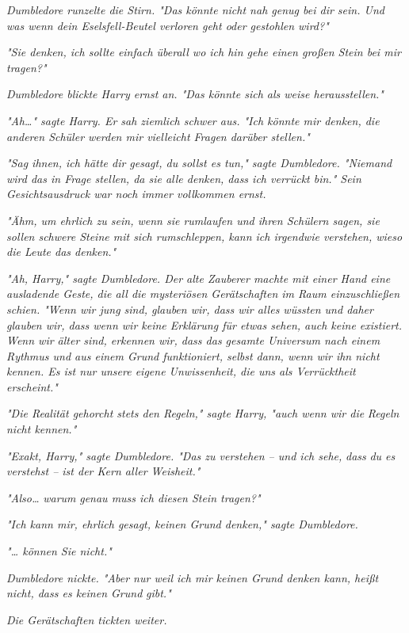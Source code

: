 {\emph{Dumbledore runzelte die Stirn. "Das könnte nicht nah genug bei dir sein. Und was wenn dein Eselsfell-Beutel verloren geht oder gestohlen wird?"}

\emph{"Sie denken, ich sollte einfach überall wo ich hin gehe einen großen Stein bei mir tragen?"}

\emph{Dumbledore blickte Harry ernst an. "Das könnte sich als weise herausstellen."}

\emph{"Ah…" sagte Harry. Er sah ziemlich schwer aus. "Ich könnte mir denken, die anderen Schüler werden mir vielleicht Fragen darüber stellen."}

\emph{"Sag ihnen, ich hätte dir gesagt, du sollst es tun," sagte Dumbledore. "Niemand wird das in Frage stellen, da sie alle denken, dass ich verrückt bin." Sein Gesichtsausdruck war noch immer vollkommen ernst.}

\emph{"Ähm, um ehrlich zu sein, wenn sie rumlaufen und ihren Schülern sagen, sie sollen schwere Steine mit sich rumschleppen, kann ich irgendwie verstehen, wieso die Leute das denken."}

\emph{"Ah, Harry," sagte Dumbledore. Der alte Zauberer machte mit einer Hand eine ausladende Geste, die all die mysteriösen Gerätschaften im Raum einzuschließen schien. "Wenn wir jung sind, glauben wir, dass wir alles wüssten und daher glauben wir, dass wenn wir keine Erklärung für etwas sehen, auch keine existiert. Wenn wir älter sind, erkennen wir, dass das gesamte Universum nach einem Rythmus und aus einem Grund funktioniert, selbst dann, wenn wir ihn nicht kennen. Es ist nur unsere eigene Unwissenheit, die uns als Verrücktheit erscheint."}

\emph{"Die Realität gehorcht stets den Regeln," sagte Harry, "auch wenn wir die} \emph{Regeln nicht kennen."}

\emph{"Exakt, Harry," sagte Dumbledore. "Das zu verstehen -- und ich sehe,} \emph{\emph{dass}} \emph{du es verstehst -- ist der Kern aller Weisheit."}

\emph{"Also…} \emph{\emph{warum}} \emph{genau muss ich diesen Stein tragen?"}

\emph{"Ich kann mir, ehrlich gesagt, keinen Grund denken," sagte Dumbledore.}

\emph{"… können Sie nicht."}

\emph{Dumbledore nickte. "Aber nur weil ich mir keinen Grund denken kann, heißt nicht, dass es keinen Grund} \emph{\emph{gibt.}"}

\emph{Die Gerätschaften tickten weiter.}

}
